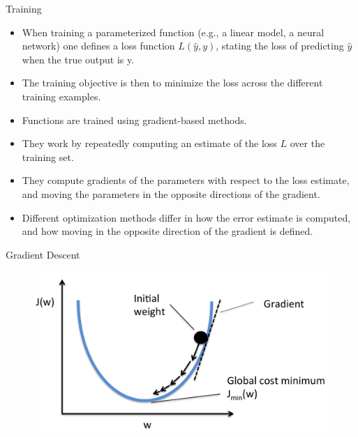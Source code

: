 \documentclass[handout]{beamer}
\begin{document}
\begin{frame}{Training}
\begin{scriptsize}
\begin{itemize}
\item  When training a parameterized function (e.g., a linear model, a neural network) one defines a loss function $L(\hat{y}, y)$, stating the loss of predicting $\hat{y}$ when the true output is y.

\item The training objective is then to minimize the loss across the different training examples. 

\item Functions are trained using  gradient-based methods.

\item They work by repeatedly computing an estimate of the loss $L$ over the training set.

\item They compute gradients of the parameters with respect to the loss estimate, and moving the parameters in the opposite directions of the gradient. 

\item Different optimization methods differ in how the error estimate is computed, and how moving in the opposite direction of the gradient is defined.

\end{itemize}


\end{scriptsize}
\end{frame}



\begin{frame}{Gradient Descent}
\begin{figure}[htb]
	\centering
	 \includegraphics[scale=0.15]{pics/sgd.png}
\end{figure}


\end{frame}
\end{document}

